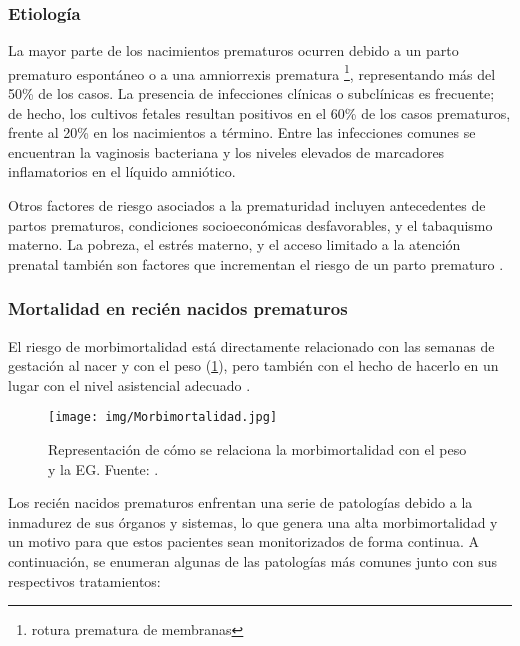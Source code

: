 \subsubsection{Etiología} 

La mayor parte de los nacimientos prematuros ocurren debido a un parto prematuro espontáneo o a una amniorrexis prematura \footnote{rotura prematura de membranas}, representando más del 50\% de los casos. La presencia de infecciones clínicas o subclínicas es frecuente; de hecho, los cultivos fetales resultan positivos en el 60\% de los casos prematuros, frente al 20\% en los nacimientos a término. Entre las infecciones comunes se encuentran la vaginosis bacteriana y los niveles elevados de marcadores inflamatorios en el líquido amniótico. 

Otros factores de riesgo asociados a la prematuridad incluyen antecedentes de partos prematuros, condiciones socioeconómicas desfavorables, y el tabaquismo materno. La pobreza, el estrés materno, y el acceso limitado a la atención prenatal también son factores que incrementan el riesgo de un parto prematuro \cite{rellan2008prematuro}.

\subsubsection{Mortalidad en recién nacidos prematuros}

El riesgo de morbimortalidad está directamente relacionado con las semanas de gestación al nacer y con el peso (\ref{fig:Morbimortalidad}), pero también con el hecho de hacerlo en un lugar con el nivel asistencial adecuado \cite{COSTAS2005}.

\begin{figure}[H]
    \centering
    \texttt{[image: img/Morbimortalidad.jpg]}
    \caption{Representación de cómo se relaciona la morbimortalidad con el peso y la EG. Fuente: \cite{santesteban2012mortalidad}.}
    \label{fig:Morbimortalidad}
\end{figure}

Los recién nacidos prematuros enfrentan una serie de patologías debido a la inmadurez de sus órganos y sistemas, lo que genera una alta morbimortalidad y un motivo para que estos pacientes sean monitorizados de forma continua. A continuación, se enumeran algunas de las patologías más comunes junto con sus respectivos tratamientos:

